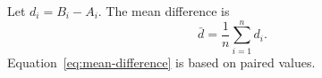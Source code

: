 \documentclass{article}
\begin{document}
Let $d_i=B_i-A_i$. The mean difference is
\begin{equation}
  \bar d=\frac{1}{n}\sum_{i=1}^{n}d_i.
  \label{eq:mean-difference}
\end{equation}
Equation~\eqref{eq:mean-difference} is based on paired values.
\end{document}
